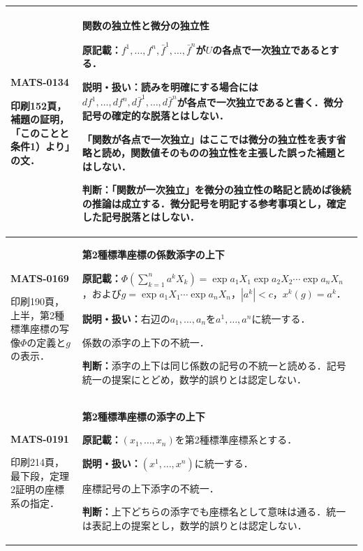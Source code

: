 \documentclass[a4paper,10pt]{ltjsarticle}
\begin{document}
\begin{longtable}{@{}>{\raggedright\arraybackslash}p{.19\linewidth}>{\raggedright\arraybackslash}p{.77\linewidth}@{}}
\hypertarget{MATS-0134}{}\textbf{MATS-0134}\par 印刷152頁，補題の証明，「このことと条件1）より」の文． & \textbf{関数の独立性と微分の独立性}\par\textbf{原記載：}$f^1,\ldots,f^n,\bar f^1,\ldots,\bar f^n$が$U$の各点で一次独立であるとする．\par\textbf{説明・扱い：}読みを明確にする場合には$df^1,\ldots,df^n,d\bar f^1,\ldots,d\bar f^n$が各点で一次独立であると書く．微分記号の確定的な脱落とはしない．\par 「関数が各点で一次独立」はここでは微分の独立性を表す省略と読め，関数値そのものの独立性を主張した誤った補題とはしない．\par\textbf{判断：}「関数が一次独立」を微分の独立性の略記と読めば後続の推論は成立する．微分記号を明記する参考事項とし，確定した記号脱落とはしない． \\[3pt]
\hline
\hypertarget{MATS-0169}{}\textbf{MATS-0169}\par 印刷190頁，上半，第2種標準座標の写像$\Phi$の定義と$g$の表示． & \textbf{第2種標準座標の係数添字の上下}\par\textbf{原記載：}$\Phi(\sum_{k=1}^n a^kX_k)=\exp a_1X_1\exp a_2X_2\cdots\exp a_nX_n$，および$g=\exp a_1X_1\cdots\exp a_nX_n$，$|a^k|<c$，$x^k(g)=a^k$．\par\textbf{説明・扱い：}右辺の$a_1,\ldots,a_n$を$a^1,\ldots,a^n$に統一する．\par 係数の添字の上下の不統一．\par\textbf{判断：}添字の上下は同じ係数の記号の不統一と読める．記号統一の提案にとどめ，数学的誤りとは認定しない． \\[3pt]
\hline
\hypertarget{MATS-0191}{}\textbf{MATS-0191}\par 印刷214頁，最下段，定理2証明の座標系の指定． & \textbf{第2種標準座標の添字の上下}\par\textbf{原記載：}$(x_1,\ldots,x_n)$を第2種標準座標系とする．\par\textbf{説明・扱い：}$(x^1,\ldots,x^n)$に統一する．\par 座標記号の上下添字の不統一．\par\textbf{判断：}上下どちらの添字でも座標名として意味は通る．統一は表記上の提案とし，数学的誤りとは認定しない． \\[3pt]
\hline

\end{longtable}
\end{document}
